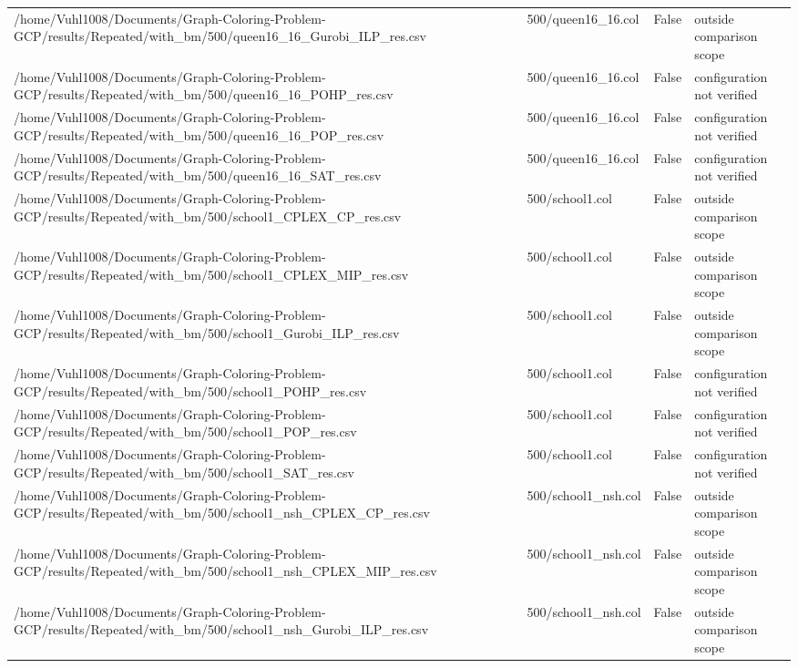 \begin{table}[htbp]
\begin{tabular}{llll}
/home/Vuhl1008/Documents/Graph-Coloring-Problem-GCP/results/Repeated/with\_bm/500/queen16\_16\_Gurobi\_ILP\_res.csv & 500/queen16\_16.col & False & outside comparison scope \\
/home/Vuhl1008/Documents/Graph-Coloring-Problem-GCP/results/Repeated/with\_bm/500/queen16\_16\_POHP\_res.csv & 500/queen16\_16.col & False & configuration not verified \\
/home/Vuhl1008/Documents/Graph-Coloring-Problem-GCP/results/Repeated/with\_bm/500/queen16\_16\_POP\_res.csv & 500/queen16\_16.col & False & configuration not verified \\
/home/Vuhl1008/Documents/Graph-Coloring-Problem-GCP/results/Repeated/with\_bm/500/queen16\_16\_SAT\_res.csv & 500/queen16\_16.col & False & configuration not verified \\
/home/Vuhl1008/Documents/Graph-Coloring-Problem-GCP/results/Repeated/with\_bm/500/school1\_CPLEX\_CP\_res.csv & 500/school1.col & False & outside comparison scope \\
/home/Vuhl1008/Documents/Graph-Coloring-Problem-GCP/results/Repeated/with\_bm/500/school1\_CPLEX\_MIP\_res.csv & 500/school1.col & False & outside comparison scope \\
/home/Vuhl1008/Documents/Graph-Coloring-Problem-GCP/results/Repeated/with\_bm/500/school1\_Gurobi\_ILP\_res.csv & 500/school1.col & False & outside comparison scope \\
/home/Vuhl1008/Documents/Graph-Coloring-Problem-GCP/results/Repeated/with\_bm/500/school1\_POHP\_res.csv & 500/school1.col & False & configuration not verified \\
/home/Vuhl1008/Documents/Graph-Coloring-Problem-GCP/results/Repeated/with\_bm/500/school1\_POP\_res.csv & 500/school1.col & False & configuration not verified \\
/home/Vuhl1008/Documents/Graph-Coloring-Problem-GCP/results/Repeated/with\_bm/500/school1\_SAT\_res.csv & 500/school1.col & False & configuration not verified \\
/home/Vuhl1008/Documents/Graph-Coloring-Problem-GCP/results/Repeated/with\_bm/500/school1\_nsh\_CPLEX\_CP\_res.csv & 500/school1\_nsh.col & False & outside comparison scope \\
/home/Vuhl1008/Documents/Graph-Coloring-Problem-GCP/results/Repeated/with\_bm/500/school1\_nsh\_CPLEX\_MIP\_res.csv & 500/school1\_nsh.col & False & outside comparison scope \\
/home/Vuhl1008/Documents/Graph-Coloring-Problem-GCP/results/Repeated/with\_bm/500/school1\_nsh\_Gurobi\_ILP\_res.csv & 500/school1\_nsh.col & False & outside comparison scope \\

\end{tabular}
\end{table}
